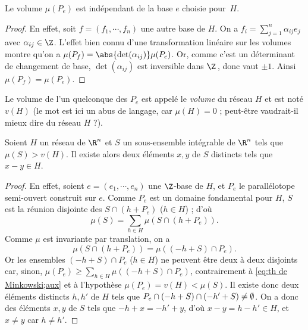 \documentclass[11pt, %
  title in boldface,
  theorem in new line,
  theorem numbering = section,
  number theorems separately,
  simple name,
]{beaulivre}
\begin{document}
    \begin{lemma}
        Le volume \( \mu(P_e) \) est indépendant de la base \( e \) choisie pour~\( H \).
    \end{lemma}
    \begin{proof}
        En effet, soit \( f = (f_1, \cdots, f_n) \) une autre base de \( H \). On a \( f_i = \sum_{j=1}^n \alpha_{ij}e_j \) avec \( \alpha_{ij} \in \Z \). L'effet bien connu d'une transformation linéaire sur les volumes montre qu'on a \( \mu(P_f) = \abs{\det(\alpha_{ij})} \mu(P_e) \). Or, comme c'est un déterminant de changement de base, \( \det(\alpha_{ij}) \) est inversible dans \( \Z \)\,, donc vaut \( \pm 1 \). Ainsi \( \mu(P_f) = \mu(P_e) \).
    \end{proof}

    Le volume de l'un quelconque des \( P_e \) est appelé le \emph{volume} du réseau \( H \) et est noté \( v(H) \) (le mot  est ici un abus de langage, car \( \mu(H) = 0 \) ; peut-être vaudrait-il mieux dire  du réseau \( H \) ?).

    \begin{theorem}[Minkowski]\label{thm:Minkowski}
        Soient \( H \) un réseau de \( \R^n \) et \( S \) un sous-ensemble intégrable de \( \R^n \) tels que \( \mu(S) > v(H) \). Il existe alors deux éléments \( x, y \) de \( S \) distincts tels que \( x-y \in H \).
    \end{theorem}
    \begin{proof}
        En effet, soient \( e = (e_1, \cdots, e_n) \) une \( \Z \)‑base de \( H \), et \( P_e \) le parallélotope semi-ouvert construit sur \( e \). Comme \( P_e \) est un domaine fondamental pour \( H \), \( S \) est la réunion disjointe des \( S \cap (h + P_e) \) (\( h \in H \)) ; d'où
        \begin{equation}\label{eq:th de Minkowski;aux}
            \mu(S) = \sum_{h \in H} \mu(S \cap (h+P_e)).
        \end{equation}
        Comme \( \mu \) est invariante par translation, on a
        \[
            \mu(S \cap (h+P_e)) = \mu((-h+S) \cap P_e).
        \]
        Or les ensembles \( (-h+S) \cap P_e \) (\( h \in H \)) ne peuvent être deux à deux disjoints car, sinon, \( \mu(P_e) \geqslant \sum_{h \in H} \mu((-h+S) \cap P_e) \), contrairement à \eqref{eq:th de Minkowski;aux} et à l'hypothèse \( \mu(P_e) = v(H) < \mu(S) \). Il existe donc deux éléments distincts \( h, h' \) de \( H \) tels que \( P_e \cap (-h+S) \cap (-h'+S) \neq\nobreak \emptyset \). On a donc des éléments \( x, y \) de \( S \) tels que \( -h + x = -h' + y \), d'où \( x-y = h-h' \in H \), et \( x \neq y \) car \( h \neq h' \).
    \end{proof}
\end{document}

